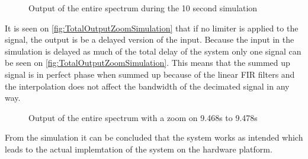 \begin{figure}[H]
    \centering
    
    \caption{Output of the entire spectrum during the 10 second simulation}
    \label{fig:TotalOutputSimulation}
\end{figure}

It is seen on \autoref{fig:TotalOutputZoomSimulation} that if no limiter is applied to the signal, the output is be a delayed version of the input. Because the input in the simulation is delayed as much of the total delay of the system only one signal can be seen on \autoref{fig:TotalOutputZoomSimulation}. This means that the summed up signal is in perfect phase when summed up because of the linear FIR filters and the interpolation does not affect the bandwidth of the decimated signal in any way.      

\begin{figure}[H]
    \centering
    
    \caption{Output of the entire spectrum with a zoom on 9.468s to 9.478s}
    \label{fig:TotalOutputZoomSimulation}
\end{figure}

From the simulation it can be concluded that the system works as intended which leads to the actual implemtation of the system on the hardware platform. 



 




